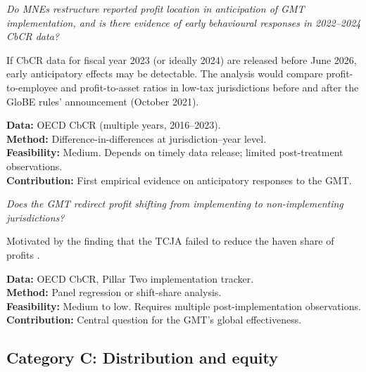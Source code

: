 \documentclass[12pt,a4paper]{article}
\begin{document}
\begin{description}[style=nextline,leftmargin=2cm]

\item[B1. Anticipatory restructuring.]
\emph{Do MNEs restructure reported profit location in anticipation of GMT implementation, and is there evidence of early behavioural responses in 2022--2024 CbCR data?}

If CbCR data for fiscal year 2023 (or ideally 2024) are released before June 2026, early anticipatory effects may be detectable.
The analysis would compare profit-to-employee and profit-to-asset ratios in low-tax jurisdictions before and after the GloBE rules' announcement (October 2021).

\textbf{Data:} OECD CbCR (multiple years, 2016--2023).\\
\textbf{Method:} Difference-in-differences at jurisdiction--year level.\\
\textbf{Feasibility:} Medium.
Depends on timely data release; limited post-treatment observations.\\
\textbf{Contribution:} First empirical evidence on anticipatory responses to the GMT.

\item[B2. Profit shifting redirection.]
\emph{Does the GMT redirect profit shifting from implementing to non-implementing jurisdictions?}

Motivated by the finding that the TCJA failed to reduce the haven share of profits \parencite{garcia2022}.

\textbf{Data:} OECD CbCR, Pillar Two implementation tracker.\\
\textbf{Method:} Panel regression or shift-share analysis.\\
\textbf{Feasibility:} Medium to low.
Requires multiple post-implementation observations.\\
\textbf{Contribution:} Central question for the GMT's global effectiveness.

\end{description}

\subsection{Category C: Distribution and equity}
\end{document}
